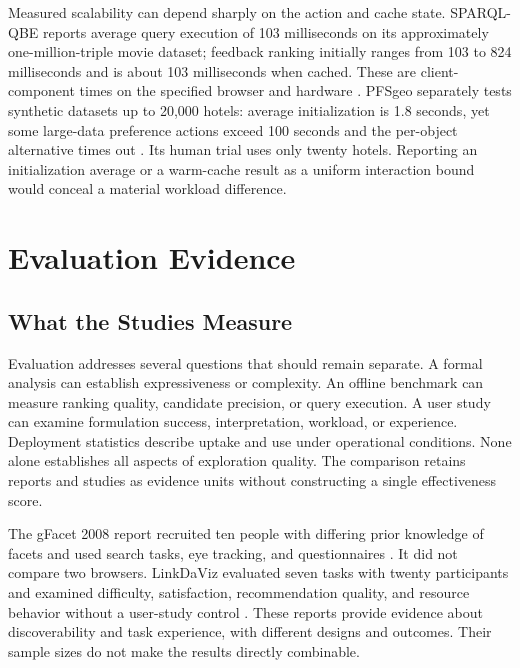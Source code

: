 \documentclass[manuscript,review,screen]{acmart}
\begin{document}
Measured scalability can depend sharply on the action and cache state. SPARQL-QBE reports average query execution of 103 milliseconds on its approximately one-million-triple movie dataset; feedback ranking initially ranges from 103 to 824 milliseconds and is about 103 milliseconds when cached. These are client-component times on the specified browser and hardware \citep{V3-02185}. PFSgeo separately tests synthetic datasets up to 20,000 hotels: average initialization is 1.8 seconds, yet some large-data preference actions exceed 100 seconds and the per-object alternative times out \citep{V3-02091}. Its human trial uses only twenty hotels. Reporting an initialization average or a warm-cache result as a uniform interaction bound would conceal a material workload difference.

\section{Evaluation Evidence}
\subsection{What the Studies Measure}
Evaluation addresses several questions that should remain separate. A formal analysis can establish expressiveness or complexity. An offline benchmark can measure ranking quality, candidate precision, or query execution. A user study can examine formulation success, interpretation, workload, or experience. Deployment statistics describe uptake and use under operational conditions. None alone establishes all aspects of exploration quality. The comparison retains reports and studies as evidence units without constructing a single effectiveness score.

The gFacet 2008 report recruited ten people with differing prior knowledge of facets and used search tasks, eye tracking, and questionnaires \citep{2008_Heim_gFacet_A}. It did not compare two browsers. LinkDaViz evaluated seven tasks with twenty participants and examined difficulty, satisfaction, recommendation quality, and resource behavior without a user-study control \citep{2015_Thellmann_LinkDaViz_Automatic}. These reports provide evidence about discoverability and task experience, with different designs and outcomes. Their sample sizes do not make the results directly combinable.
\end{document}
